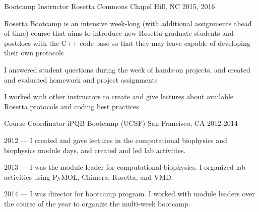

\begin{cventries}

  \cventry
  {Bootcamp Instructor} %
  {Rosetta Commons} %
  {Chapel Hill, NC} %
  {2015, 2016} %
  {
    \begin{cvitems} %
    \item Rosetta Bootcamp is an intensive week-long (with additional assignments ahead of time) course
      that aims to introduce new Rosetta graduate students and postdocs with the C++ code base so that they may leave capable
      of developing their own protocols
    \item I answered student questions during the week of hands-on projects, and created and evaluated homework and project assignments
    \item I worked with other instructors to create and give lectures about available Rosetta protocols and coding best practices
    \end{cvitems}
  }

  \cventry
  {Course Coordinator} %
  {iPQB Bootcamp (UCSF)} %
  {San Francisco, CA} %
  {2012-2014} %
  {
    \begin{cvitems} %
    \item {2012 --- I created and gave lectures in the computational biophysics and biophysics module days, and created and led lab activities.}
    \item {2013 --- I was the module leader for computational biophysics. I organized lab activities using PyMOL, Chimera, Rosetta, and VMD.}
    \item {2014 --- I was director for bootcamp program. I worked with module leaders over the course of the year to organize the multi-week bootcamp.}
    \end{cvitems}
  }


\end{cventries}
